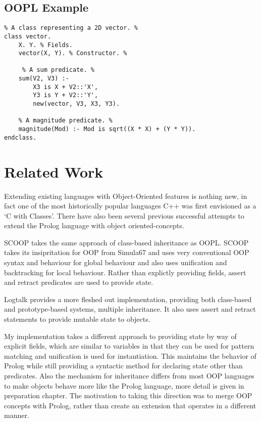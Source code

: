\documentclass[12pt,a4paper,twoside,openright]{report}
\begin{document}
\subsection {OOPL Example}

\begin{lstlisting}
% A class representing a 2D vector. %
class vector. 
	X. Y. % Fields.
	vector(X, Y). % Constructor. %
	
	 % A sum predicate. %
	sum(V2, V3) :- 
		X3 is X + V2::'X',
		Y3 is Y + V2::'Y',
		new(vector, V3, X3, Y3).
		
	% A magnitude predicate. %
	magnitude(Mod) :- Mod is sqrt((X * X) + (Y * Y)). 
endclass.
\end{lstlisting}

\section{Related Work}

Extending existing languages with Object-Oriented features is nothing new, in fact one of the most historically popular languages C++ was first envisioned as a `C with Classes'\cite{CPP}. There have also been several previous successful attempts to extend the Prolog language with object oriented-concepts.

\bigskip

SCOOP\cite{SCOOP}  takes the same approach of class-based inheritance as OOPL. SCOOP takes its insipritation for OOP from Simula67 and uses very conventional OOP syntax and behaviour for global behaviour and also uses unification and backtracking for local behaviour. Rather than explictly providing fields, assert and retract predicates are used to provide state.

\bigskip

Logtalk\cite{LOGTALK} provides a more fleshed out implementation, providing both class-based and prototype-based systems, multiple inheritance. It also uses assert and retract statements to provide mutable state to objects. 

\bigskip

My implementation takes a different approach to providing state by way of explicit fields, which are similar to variables in that they can be used for pattern matching and unification is used for instantiation. This maintains the behavior of Prolog while still providing a syntactic method for declaring state other than predicates. Also the mechanism for inheritance differs from most OOP languages to make objects behave more like the Prolog language, more detail is given in preparation chapter. The motivation to taking this direction was to merge OOP concepts with Prolog, rather than create an extension that operates in a different manner.
\end{document}
